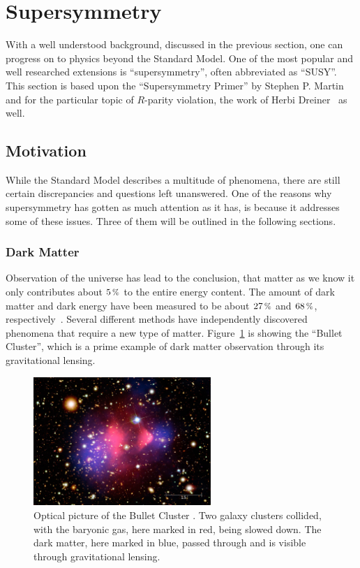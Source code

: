 \section{Supersymmetry}

With a well understood background, discussed in the previous section, one can progress on to physics beyond the Standard Model. One of the most popular and well researched extensions is ``supersymmetry'', often abbreviated as ``SUSY''. This section is based upon the ``Supersymmetry Primer'' by Stephen P. Martin~\cite{susyprimer} and for the particular topic of $R$-parity violation, the work of Herbi Dreiner~\cite{b3def,b3p6} as well.

\subsection{Motivation}

While the Standard Model describes a multitude of phenomena, there are still certain discrepancies and questions left unanswered. One of the reasons why supersymmetry has gotten as much attention as it has, is because it addresses some of these issues. Three of them will be outlined in the following sections.

\subsubsection{Dark Matter}
\label{sec:dm}

Observation of the universe has lead to the conclusion, that matter as we know it only contributes about $5\,\pct$ to the entire energy content. The amount of dark matter and dark energy have been measured to be about $27\,\pct$ and $68\,\pct$, respectively~\cite{planck}. Several different methods have independently discovered phenomena that require a new type of matter. Figure~\ref{fig:gravlens} is showing the ``Bullet Cluster'', which is a prime example of dark matter observation through its gravitational lensing.

\begin{figure}[ht!]
  \centering
  \includegraphics[width=0.6\textwidth]{plots/bulletcluster.jpg}
  \caption{Optical picture of the Bullet Cluster \cite{gravlens}. Two galaxy clusters collided, with the baryonic gas, here marked in red, being slowed down. The dark matter, here marked in blue, passed through and is visible through gravitational lensing.}
  \label{fig:gravlens}
\end{figure}

